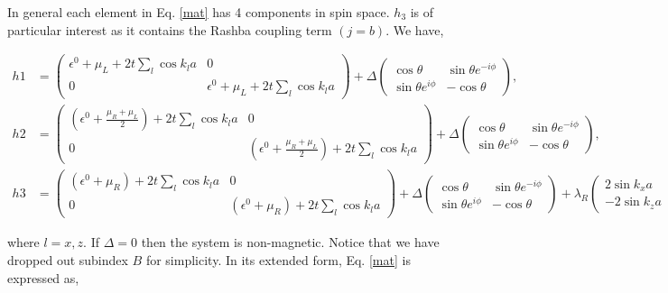 \documentclass[10pt,prb,showpacs,amssymb,floatfix]{revtex4-1}
\newcommand{\Dlt}{\Delta}
\newcommand{\eps}{\epsilon}
\begin{document}
In general  each element in Eq. \eqref{mat} has 4 components in spin space. $h_3$ is of particular interest as it contains the Rashba coupling term $(j=b)$. We have,

\begin{widetext}
\begin{align}
h1 &=\left(\begin{array}{cc} 
\eps^0 + \mu_L +2t \sum_{l}\cos k_la &  0\\
0 &  \eps^0 + \mu_L +2t \sum_{l}\cos k_la
\end{array}\right) +\Dlt \left(\begin{array}{cc} 
\cos\theta  &  \sin\theta e^{-i\phi}\\
\sin\theta e^{i\phi} &  -\cos\theta
\end{array}\right),\\
h2 &=\left(\begin{array}{cc} 
(\eps^0 + \frac{\mu_R + \mu_L}{2}) +2t \sum_{l}\cos k_la &  0\\
0 &  (\eps^0 + \frac{\mu_R + \mu_L}{2}) +2t \sum_{l}\cos k_la
\end{array}\right)+\Dlt \left(\begin{array}{cc} 
\cos\theta  &  \sin\theta e^{-i\phi}\\
\sin\theta e^{i\phi} &  -\cos\theta
\end{array}\right),\\
h3 &=\left(\begin{array}{cc} 
(\eps^0 +\mu_R) +2t \sum_{l}\cos k_la &  0\\
0 &  (\eps^0 + \mu_R) +2t \sum_{l}\cos k_la
\end{array}\right) +\Dlt \left(\begin{array}{cc} 
\cos\theta  &  \sin\theta e^{-i\phi}\\
\sin\theta e^{i\phi} &  -\cos\theta
\end{array}\right)
+\lambda_{R} \left(\begin{array}{cc} 
2\sin k_xa  &  -2\sin k_za\\
-2\sin k_za &  -2\sin k_xa
\end{array}\right),
\label{mat2}
\end{align}
\end{widetext}

where $l=x,z$. If $\Dlt=0$ then the system is non-magnetic. Notice that we have dropped out subindex $B$ for simplicity. In its extended form, Eq. \eqref{mat} is expressed as,
\end{document}

